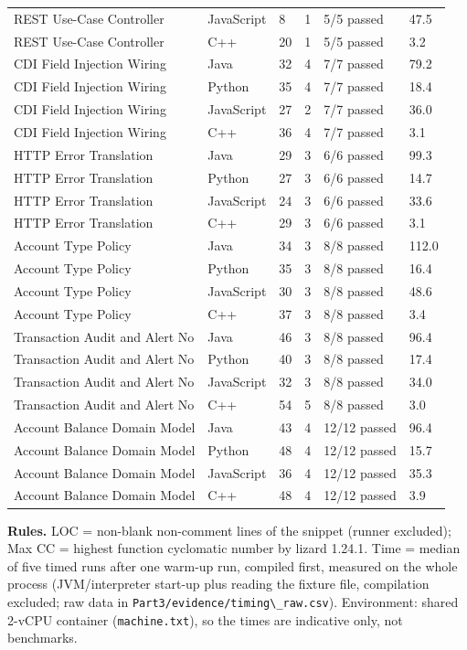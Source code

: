 \documentclass[11pt,a4paper]{article}
\begin{document}
{\begin{longtable}{@{}p{5.6cm}p{2.2cm}p{1.2cm}p{1.4cm}p{2.4cm}p{2cm}@{}}
REST Use-Case Controller & JavaScript & 8 & 1 & 5/5 passed & 47.5 \\
REST Use-Case Controller & C++ & 20 & 1 & 5/5 passed & 3.2 \\
CDI Field Injection Wiring & Java & 32 & 4 & 7/7 passed & 79.2 \\
CDI Field Injection Wiring & Python & 35 & 4 & 7/7 passed & 18.4 \\
CDI Field Injection Wiring & JavaScript & 27 & 2 & 7/7 passed & 36.0 \\
CDI Field Injection Wiring & C++ & 36 & 4 & 7/7 passed & 3.1 \\
HTTP Error Translation & Java & 29 & 3 & 6/6 passed & 99.3 \\
HTTP Error Translation & Python & 27 & 3 & 6/6 passed & 14.7 \\
HTTP Error Translation & JavaScript & 24 & 3 & 6/6 passed & 33.6 \\
HTTP Error Translation & C++ & 29 & 3 & 6/6 passed & 3.1 \\
Account Type Policy & Java & 34 & 3 & 8/8 passed & 112.0 \\
Account Type Policy & Python & 35 & 3 & 8/8 passed & 16.4 \\
Account Type Policy & JavaScript & 30 & 3 & 8/8 passed & 48.6 \\
Account Type Policy & C++ & 37 & 3 & 8/8 passed & 3.4 \\
Transaction Audit and Alert No & Java & 46 & 3 & 8/8 passed & 96.4 \\
Transaction Audit and Alert No & Python & 40 & 3 & 8/8 passed & 17.4 \\
Transaction Audit and Alert No & JavaScript & 32 & 3 & 8/8 passed & 34.0 \\
Transaction Audit and Alert No & C++ & 54 & 5 & 8/8 passed & 3.0 \\
Account Balance Domain Model & Java & 43 & 4 & 12/12 passed & 96.4 \\
Account Balance Domain Model & Python & 48 & 4 & 12/12 passed & 15.7 \\
Account Balance Domain Model & JavaScript & 36 & 4 & 12/12 passed & 35.3 \\
Account Balance Domain Model & C++ & 48 & 4 & 12/12 passed & 3.9 \\
\end{longtable}
}
\textbf{Rules.} LOC = non-blank non-comment lines of the snippet (runner excluded); Max CC = highest function cyclomatic number by lizard 1.24.1. Time = median of five timed runs after one warm-up run, compiled first, measured on the whole process (JVM/interpreter start-up plus reading the fixture file, compilation excluded; raw data in \texttt{Part3/\allowbreak{}evidence/\allowbreak{}timing\textbackslash{}\_\allowbreak{}raw.\allowbreak{}csv}). Environment: shared 2-vCPU container (\texttt{machine.\allowbreak{}txt}), so the times are indicative only, not benchmarks.
\end{document}
